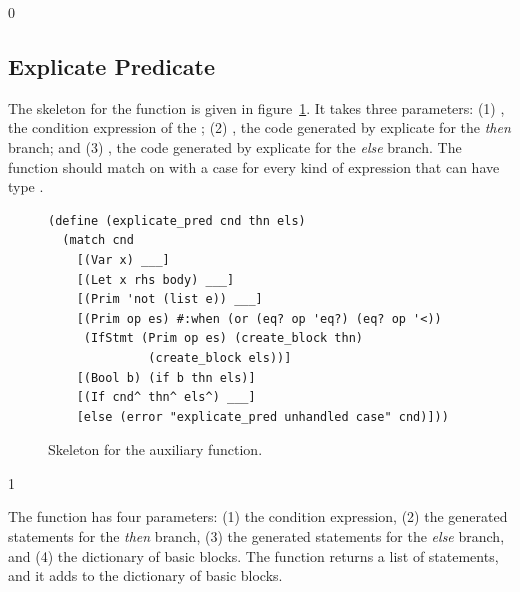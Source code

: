 \documentclass[7x10]{TimesAPriori_MIT}%
\def\racketEd{0}
\def\pythonEd{1}
\def\edition{1}
\newcommand{\pythonColor}[0]{}
\numberwithin{theorem}{chapter}
\numberwithin{definition}{chapter}
\numberwithin{equation}{chapter}
\begin{document}
{\if\edition\racketEd
  
\subsection{Explicate Predicate}

The skeleton for the  function is given in
figure~\ref{fig:explicate-pred}.  It takes three parameters: (1)
, the condition expression of the ; (2) ,
the code generated by explicate for the \emph{then} branch; and (3)
, the code generated by explicate for the \emph{else}
branch.  The  function should match on
 with a case for every kind of expression that can have type
\BOOLTY{}.

\begin{figure}[tbp]
  \begin{tcolorbox}[colback=white]
    \begin{lstlisting}
(define (explicate_pred cnd thn els)
  (match cnd
    [(Var x) ___]
    [(Let x rhs body) ___]
    [(Prim 'not (list e)) ___]
    [(Prim op es) #:when (or (eq? op 'eq?) (eq? op '<))
     (IfStmt (Prim op es) (create_block thn)
              (create_block els))]
    [(Bool b) (if b thn els)]
    [(If cnd^ thn^ els^) ___]
    [else (error "explicate_pred unhandled case" cnd)]))
\end{lstlisting}
  \end{tcolorbox}

  \caption{Skeleton for the  auxiliary function.}
\label{fig:explicate-pred}
\end{figure}

\fi}
%
{\if\edition\pythonEd\pythonColor

The  function has four parameters: (1) the
condition expression, (2) the generated statements for the \emph{then}
branch, (3) the generated statements for the \emph{else} branch, and
(4) the dictionary of basic blocks. The 
function returns a list of statements, and it adds to the dictionary
of basic blocks.

\fi}
\end{document}
